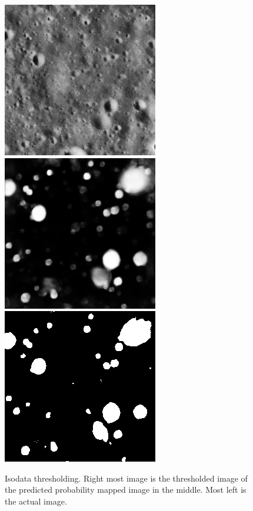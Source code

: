 \documentclass[11pt]{article}
\begin{document}
\begin{figure}[H]
	\includegraphics[width=.3\textwidth]{files/results/26.png}\hfill	
	\includegraphics[width=.3\textwidth]{files/results/26_predict.png}\hfill
	\includegraphics[width=.3\textwidth]{files/results/isodata.png}\hfill
	\caption{Isodata thresholding. Right most image is the thresholded image of the predicted probability mapped image in the middle. Most left is the actual image.}
	\label{isodata thresholding}
\end{figure}
\end{document}
